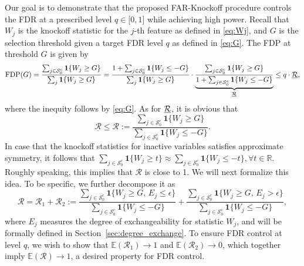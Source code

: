 ﻿\documentclass[12pt]{article}
\newcommand{\0}{\mbox{\bf 0}}
\theoremstyle{plain}%
\theoremstyle{definition}
\begin{document}
{Our goal is to demonstrate that the proposed FAR-Knockoff procedure controls
the FDR at a prescribed level $q\in \lbrack 0,1]$ while achieving high
power. Recall that $W_{j}$ is the knockoff statistic for the $j$-th feature
as defined in \eqref{eq:Wj}, and $G$ is the selection threshold given a
target FDR level $q$ as defined in \eqref{eq:G}. The FDP at threshold $G$ is
given by 
\begin{equation*}
\text{FDP}(G)=\frac{\sum_{j\in \mathcal{S}_{0}^{c}}\mathbf{1}\{W_{j}\geq G\}%
}{\sum_{j}\mathbf{1}\{W_{j}\geq G\}}=\frac{1+\sum_{j\in \mathcal{S}_{0}^{c}}%
\mathbf{1}\{W_{j}\leq -G\}}{\sum_{j}\mathbf{1}\{W_{j}\geq G\}}\cdot 
\underbrace{\frac{\sum_{j\in \mathcal{S}_{0}^{c}}\mathbf{1}\{W_{j}\geq G\}}{%
1+\sum_{j\in \mathcal{S}_{0}^{c}}\mathbf{1}\{W_{j}\leq -G\}}}_{\underline{%
\mathcal{R}}}\leq q\cdot \underline{\mathcal{R}},
\end{equation*}%
where the inequity follows by \eqref{eq:G}. As for $\underline{%
\mathcal{R}}$, it is obvious that 
\begin{equation*}
\underline{\mathcal{R}}\leq \mathcal{R}:=\frac{\sum_{j\in \mathcal{S}%
_{0}^{c}}\mathbf{1}\{W_{j}\geq G\}}{\sum_{j\in \mathcal{S}_{0}^{c}}\mathbf{1}%
\{W_{j}\leq -G\}}.
\end{equation*}
In case that the knockoff statistics for inactive variables satisfies approximate symmetry, it follows that $
\sum_{j \in \mathcal{S}_0^c} \mathbf{1}\{W_j \geq t\} {\approx} \sum_{j \in \mathcal{S}_0^c} \mathbf{1}\{W_j \leq -t\},  \forall t \in \mathbb{R}$. Roughly speaking, this implies that $\mathcal{R}$ is close to 1. We will next formalize this idea. To be specific,  we further decompose it as
\begin{equation}
\mathcal{R} = \mathcal{R}_1 + \mathcal{R}_2 := 
\frac{\sum_{j \in \mathcal{S}_0^c } \mathbf{1}\{W_j \geq G,\, E_j \leq \epsilon\}}{\sum_{j \in \mathcal{S}_0^c } \mathbf{1}\{W_j \leq -G\}} +
\frac{\sum_{j \in \mathcal{S}_0^c } \mathbf{1}\{W_j \geq G,\, E_j > \epsilon\}}{\sum_{j \in \mathcal{S}_0^c } \mathbf{1}\{W_j \leq -G\}},
\label{eq:R1R2}
\end{equation}
where $E_j$ measures the degree of exchangeability for statistic $W_j$, and will be formally defined in Section~\ref{sec:degree_exchange}. To ensure FDR control at level $q$, we wish to show that $\mathbb{E}(\mathcal{R}_1) \to 1$ and $\mathbb{E}(\mathcal{R}_2) \to 0$, which together imply $\mathbb{E}(\mathcal{R}) \to 1$, a desired property for FDR control.



}
\end{document}
